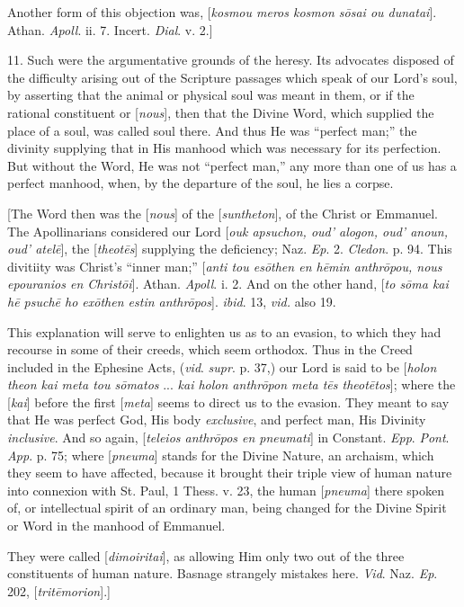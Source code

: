Another form of this objection was, [\emph{kosmou meros kosmon s\={o}sai
ou dunatai}]. Athan. \emph{Apoll}. ii. 7. Incert. \emph{Dial}. v.
2.]

11. Such were the argumentative grounds of the heresy. Its
advocates disposed of the difficulty arising out of the Scripture
passages which speak of our Lord's soul, by asserting that the animal
or physical soul was meant in them, or if the rational constituent or
[\emph{nous}], then that the Divine Word, which supplied the place of
a soul, was called soul there. And thus He was ``perfect
man;'' the divinity supplying that in His manhood which was
necessary for its perfection. But without the Word, He was not
``perfect man,'' any more than one of us has a perfect
manhood, when, by the departure of the soul, he lies a corpse.

[The Word then was the [\emph{nous}] of the [\emph{suntheton}], of
the Christ or Emmanuel. The Apollinarians considered our Lord [\emph{ouk
apsuchon, oud' alogon, oud' anoun, oud' atel\={e}}], the [\emph{theot\={e}s}]
supplying the deficiency; Naz. \emph{Ep}. 2. \emph{Cledon}. p. 94.
This divitiity was Christ's ``inner man;'' [\emph{anti tou es\={o}then
en h\={e}min anthr\={o}pou, nous epouranios en Christ\={o}i}].
Athan. \emph{Apoll}. i. 2. And on the other hand, [\emph{to s\={o}ma
kai h\={e} psuch\={e} ho ex\={o}then estin anthr\={o}pos}].
\emph{ibid}. 13, \emph{vid.} also 19.

This explanation will serve to enlighten us as to an evasion, to
which they had
recourse in some of their creeds, which seem orthodox. Thus in the
Creed included in the Ephesine Acts, (\emph{vid}. \emph{supr}. p. 37,)
our Lord is said to be [\emph{holon theon kai meta tou s\={o}matos}
... \emph{kai holon anthr\={o}pon meta t\={e}s theot\={e}tos}];
where the [\emph{kai}] before the first [\emph{meta}] seems to direct
us to the evasion. They meant to say that He was perfect God, His body
\emph{exclusive}, and perfect man, His Divinity \emph{inclusive}. And
so again, [\emph{teleios anthr\={o}pos en pneumati}] in Constant. \emph{Epp}.
\emph{Pont}. \emph{App}. p. 75; where [\emph{pneuma}] stands for the
Divine Nature, an archaism, which they seem to have affected, because
it brought their triple view of human nature into connexion with St.
Paul, 1 Thess. v. 23, the human [\emph{pneuma}] there spoken of, or
intellectual spirit of an ordinary man, being changed for the Divine
Spirit or Word in the manhood of Emmanuel.

They were called [\emph{dimoiritai}], as allowing Him only two out
of the three constituents of human nature. Basnage strangely mistakes
here. \emph{Vid}. Naz. \emph{Ep}. 202, [\emph{trit\={e}morion}].]

